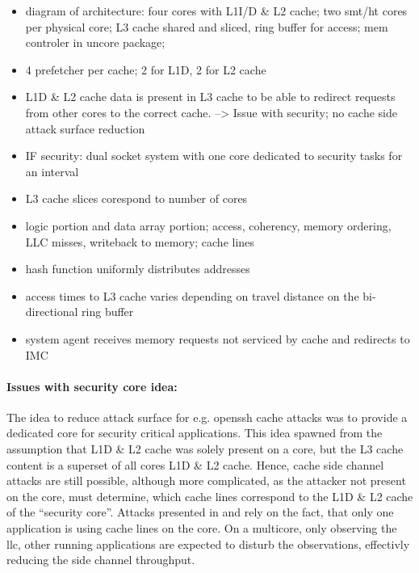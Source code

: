 \begin{itemize}
  \item diagram of architecture: four cores with L1I/D \& L2 cache; two smt/ht
    cores per physical core; L3 cache shared and sliced, ring buffer for
    access; mem controler in uncore package;
  \item 4 prefetcher per cache; 2 for L1D, 2 for L2 cache
  \item L1D \& L2 cache data is present in L3 cache to be able to redirect
    requests from other cores to the correct cache. --> Issue with security; no
    cache side attack surface reduction
  \item IF security: dual socket system with one core dedicated to security
    tasks for an interval
  \item L3 cache slices corespond to number of cores
  \item logic portion and data array portion; access, coherency, memory
    ordering, LLC misses, writeback to memory; cache lines
  \item hash function uniformly distributes addresses
  \item access times to L3 cache varies depending on travel distance on the
    bi-directional ring buffer
  \item system agent receives memory requests not serviced by cache and
    redirects to IMC
\end{itemize}

\paragraph{Issues with security core idea:}
The idea to reduce attack surface for e.g. openssh cache attacks was to provide
a dedicated core for security critical applications.
This idea spawned from the assumption that L1D \& L2 cache was solely present
on a core, but the L3 cache content is a superset of all cores L1D \& L2 cache.
Hence, cache side channel attacks are still possible, although more
complicated, as the attacker not present on the core, must determine, which
cache lines correspond to the L1D \& L2 cache of the ``security core''.
Attacks presented in \cite{yarom_recovering_2014} and
\cite{bernstein_cache-timing_2005} rely on the fact, that only one application
is using cache lines on the core.
On a multicore, only observing the \gls{llc}, other running applications are
expected to disturb the observations, effectivly reducing the side channel
throughput.

